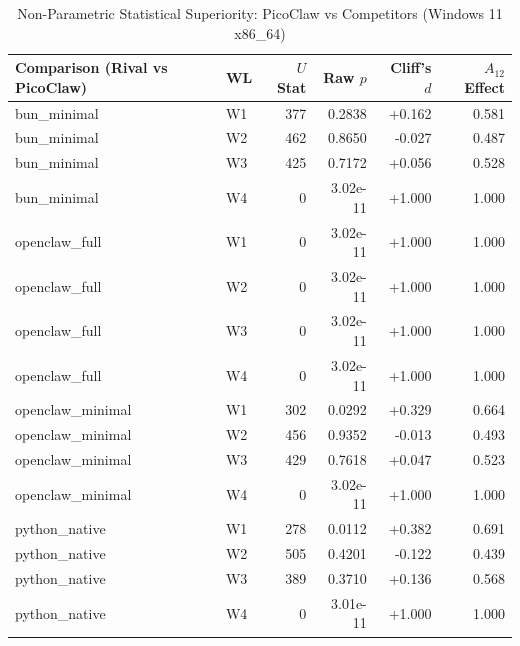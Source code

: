 \begin{table}[t]
\centering\small
\caption{Non-Parametric Statistical Superiority: PicoClaw vs Competitors (Windows 11 x86_64)}
\label{tab:Windows_stat_tests}
\begin{tabular}{llrrrr}
\toprule
Comparison (Rival vs PicoClaw) & WL & $U$ Stat & Raw $p$ & Cliff's $d$ & $A_{12}$ Effect \\
\midrule
bun\_minimal & W1 & 377 & 0.2838 & +0.162 & 0.581 \\
bun\_minimal & W2 & 462 & 0.8650 & -0.027 & 0.487 \\
bun\_minimal & W3 & 425 & 0.7172 & +0.056 & 0.528 \\
bun\_minimal & W4 & 0 & 3.02e-11 & +1.000 & 1.000 \\
openclaw\_full & W1 & 0 & 3.02e-11 & +1.000 & 1.000 \\
openclaw\_full & W2 & 0 & 3.02e-11 & +1.000 & 1.000 \\
openclaw\_full & W3 & 0 & 3.02e-11 & +1.000 & 1.000 \\
openclaw\_full & W4 & 0 & 3.02e-11 & +1.000 & 1.000 \\
openclaw\_minimal & W1 & 302 & 0.0292 & +0.329 & 0.664 \\
openclaw\_minimal & W2 & 456 & 0.9352 & -0.013 & 0.493 \\
openclaw\_minimal & W3 & 429 & 0.7618 & +0.047 & 0.523 \\
openclaw\_minimal & W4 & 0 & 3.02e-11 & +1.000 & 1.000 \\
python\_native & W1 & 278 & 0.0112 & +0.382 & 0.691 \\
python\_native & W2 & 505 & 0.4201 & -0.122 & 0.439 \\
python\_native & W3 & 389 & 0.3710 & +0.136 & 0.568 \\
python\_native & W4 & 0 & 3.01e-11 & +1.000 & 1.000 \\
\bottomrule
\end{tabular}
\end{table}
